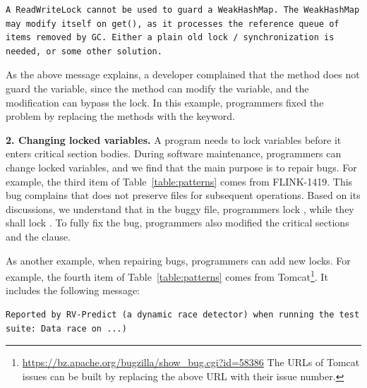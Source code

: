 \begin{lstlisting}
A ReadWriteLock cannot be used to guard a WeakHashMap. The WeakHashMap may modify itself on get(), as it processes the reference queue of items removed by GC. Either a plain old lock / synchronization is needed, or some other solution.
\end{lstlisting}

As the above message explains, a developer complained that the  method does not guard the  variable, since the  method can modify the  variable, and the modification can bypass the lock. In this example, programmers fixed the problem by replacing the methods with the  keyword.%


\noindent
\textbf{2. Changing locked variables.} A program needs to lock variables before it enters critical section bodies. During software maintenance, programmers can change locked variables, and we find that the main purpose is to repair bugs. For example, the third item of Table~\ref{table:patterns} comes from FLINK-1419. This bug complains that  does not preserve files for subsequent operations. Based on its discussions, we understand that in the buggy file, programmers lock , while they shall lock . To fully fix the bug, programmers also modified the critical sections and the  clause.

As another example, when repairing bugs, programmers can add new locks. For example, the fourth item of Table~\ref{table:patterns} comes from Tomcat\footnote{\url{https://bz.apache.org/bugzilla/show\_bug.cgi?id=58386} The URLs of Tomcat
issues can be built by replacing the above URL with their issue number.}. It includes the following message:

\begin{lstlisting}
Reported by RV-Predict (a dynamic race detector) when running the test suite: Data race on ...)
\end{lstlisting}

